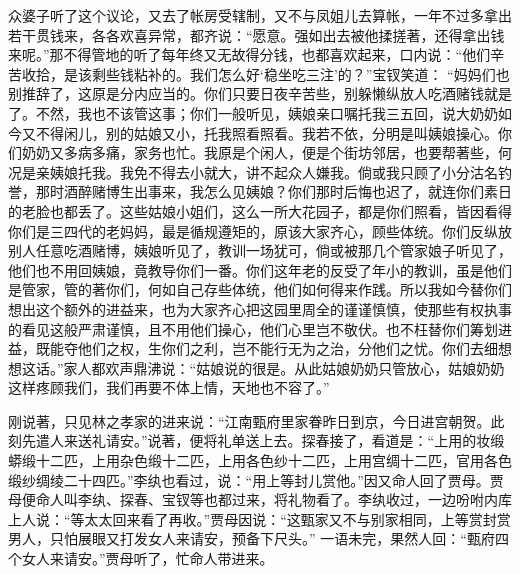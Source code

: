 \begin{parag}
    众婆子听了这个议论，又去了帐房受辖制，又不与凤姐儿去算帐，一年不过多拿出若干贯钱来，各各欢喜异常，都齐说：“愿意。强如出去被他揉搓著，还得拿出钱来呢。”那不得管地的听了每年终又无故得分钱，也都喜欢起来，口内说：“他们辛苦收拾，是该剩些钱粘补的。我们怎么好‘稳坐吃三注’的？”宝钗笑道： “妈妈们也别推辞了，这原是分内应当的。你们只要日夜辛苦些，别躲懒纵放人吃酒赌钱就是了。不然，我也不该管这事；你们一般听见，姨娘亲口嘱托我三五回，说大奶奶如今又不得闲儿，别的姑娘又小，托我照看照看。我若不依，分明是叫姨娘操心。你们奶奶又多病多痛，家务也忙。我原是个闲人，便是个街坊邻居，也要帮著些，何况是亲姨娘托我。我免不得去小就大，讲不起众人嫌我。倘或我只顾了小分沽名钓誉，那时酒醉赌博生出事来，我怎么见姨娘？你们那时后悔也迟了，就连你们素日的老脸也都丢了。这些姑娘小姐们，这么一所大花园子，都是你们照看，皆因看得你们是三四代的老妈妈，最是循规遵矩的，原该大家齐心，顾些体统。你们反纵放别人任意吃酒赌博，姨娘听见了，教训一场犹可，倘或被那几个管家娘子听见了，他们也不用回姨娘，竟教导你们一番。你们这年老的反受了年小的教训，虽是他们是管家，管的著你们，何如自己存些体统，他们如何得来作践。所以我如今替你们想出这个额外的进益来，也为大家齐心把这园里周全的谨谨慎慎，使那些有权执事的看见这般严肃谨慎，且不用他们操心，他们心里岂不敬伏。也不枉替你们筹划进益，既能夺他们之权，生你们之利，岂不能行无为之治，分他们之忧。你们去细想想这话。”家人都欢声鼎沸说：“姑娘说的很是。从此姑娘奶奶只管放心，姑娘奶奶这样疼顾我们，我们再要不体上情，天地也不容了。”
\end{parag}


\begin{parag}
    刚说著，只见林之孝家的进来说：“江南甄府里家眷昨日到京，今日进宫朝贺。此刻先遣人来送礼请安。”说著，便将礼单送上去。探春接了，看道是：“上用的妆缎蟒缎十二匹，上用杂色缎十二匹，上用各色纱十二匹，上用宫绸十二匹，官用各色缎纱绸绫二十四匹。”李纨也看过，说：“用上等封儿赏他。”因又命人回了贾母。贾母便命人叫李纨、探春、宝钗等也都过来，将礼物看了。李纨收过，一边吩咐内库上人说：“等太太回来看了再收。”贾母因说：“这甄家又不与别家相同，上等赏封赏男人，只怕展眼又打发女人来请安，预备下尺头。” 一语未完，果然人回：“甄府四个女人来请安。”贾母听了，忙命人带进来。
\end{parag}


